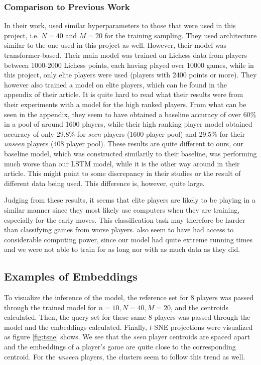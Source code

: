 \subsubsection{Comparison to Previous Work}
In their work, \cite{main_article} used similar hyperparameters to those that were used in this project, i.e. $N = 40$ and $M = 20$ for the training sampling. They used architecture similar to the one used in this project as well. However, their model was transformer-based. Their main model was trained on Lichess data from players between 1000-2000 Lichess points, each having played over 10000 games, while in this project, only elite players were used (players with 2400 points or more). They however also trained a model on elite players, which can be found in the appendix of their article. It is quite hard to read what their results were from their experiments with a model for the high ranked players. From what can be seen in the appendix, they seem to have obtained a baseline accuracy of over 60\% in a pool of around 1600 players, while their high ranking player model obtained accuracy of only 29.8\% for \emph{seen} players (1600 player pool) and 29.5\% for their \emph{unseen} players (408 player pool). These results are quite different to ours, our baseline model, which was constructed similarily to their baseline, was performing much worse than our LSTM model, while it is the other way around in their article. This might point to some discrepancy in their studies or the result of different data being used. This difference is, however, quite large.
\medskip\par 
Judging from these results, it seems that elite players are likely to be playing in a similar manner since they most likely use computers when they are training, especially for the early moves. This classification task may therefore be harder than classifying games from worse players. \cite{main_article} also seem to have had access to considerable computing power, since our model had quite extreme running times and we were not able to train for as long nor with as much data as they did.

\subsection{Examples of Embeddings}
To visualize the inference of the model, the reference set for 8 players was passed through the trained model for $n = 10, N = 40, M = 20$, and the centroids calculated. Then, the query set for these same 8 players was passed through the model and the embeddings calculated. Finally, $t$-SNE projections were visualized as figure \ref{fig:tsne} shows. We see that the \emph{seen} player centroids are spaced apart and the embeddings of a player's game are quite close to the corresponding centroid. For the \emph{unseen} players, the clusters seem to follow this trend as well.

